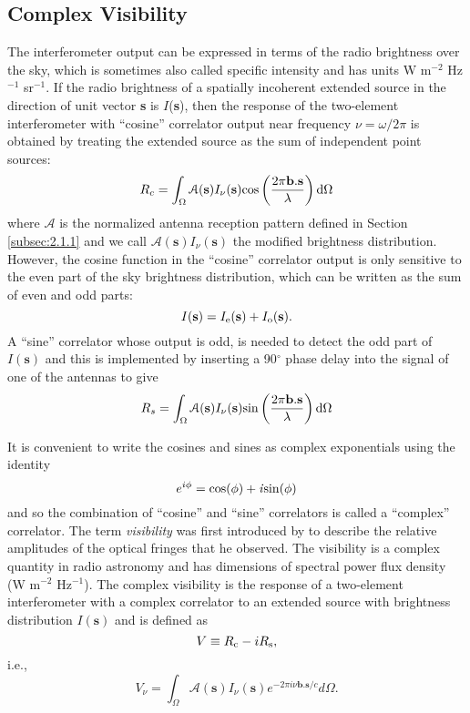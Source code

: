 \subsection{Complex Visibility}\label{subsec:6}
The interferometer output can be expressed in terms of the radio brightness over the sky, which is sometimes also called specific intensity and has units W m$^{-2}$ Hz$^{-1}$ sr$^{-1}$. If the radio brightness of a spatially incoherent extended source in the direction of unit vector \textbf{s} is $I$(\textbf{s}), then the response of the two-element interferometer with ``cosine'' correlator output near frequency $\nu =\omega/2\pi$ is obtained by treating the extended source as the sum of independent point sources:
\begin{equation}
R_{c}=\int _{\Omega}\mathcal{A}(\textbf{s})I_{\nu}(\textbf{s}) \rm{cos}\left(\frac{2\pi \textbf{b}.\textbf{s}}{\lambda} \right)d\Omega
\end{equation}
where $\mathcal{A}$ is the normalized antenna reception pattern defined in Section \ref{subsec:2.1.1} and we call $\mathcal{A}(\textbf{s})I_{\nu}(\textbf{s})$ the modified brightness distribution. However, the cosine function in the  ``cosine'' correlator output is only sensitive to the even part of the sky brightness distribution, which can be written as the sum of even and odd parts:
\begin{equation}
I(\textbf{s})=I_{\rm{e}}(\textbf{s})+I_{\rm{o}}(\textbf{s}).
\end{equation}
A ``sine'' correlator whose output is odd, is needed to detect the odd part of $I(\textbf{s})$ and this is implemented by inserting a 90$^{\circ}$ phase delay into the signal of one of the antennas to give
\begin{equation}
R_{s}=\int _{\Omega}\mathcal{A}(\textbf{s})I_{\nu}(\textbf{s}) \rm{sin}\left(\frac{2\pi \textbf{b}.\textbf{s}}{\lambda} \right)d\Omega
\end{equation}

It is convenient to write the cosines and sines as complex exponentials using the identity 
\begin{equation}
e^{i\phi} = \rm{cos}(\phi) + \mathit{i}\rm{sin}(\phi)
\end{equation}
and so the combination of ``cosine'' and ``sine'' correlators is called a ``complex'' correlator. The term \textit{visibility} was first introduced by \cite{michelson_1890} to describe the relative amplitudes of the optical fringes that he observed. The visibility is a complex quantity in radio astronomy and has dimensions of spectral power flux density (W m$^{-2}$ Hz$^{-1}$). The complex visibility is the response of a two-element interferometer with a complex correlator to an extended source with brightness distribution $I(\textbf{s})$  and is defined as
\begin{equation}
V\equiv R_{\rm{c}}-iR_{\rm{s}},
\end{equation}
i.e.,
\begin{equation}
V _{\nu} = \int _{\Omega}\mathcal{A}(\textbf{s})I_{\nu}(\textbf{s})\mathit{e}^{-2\pi \mathit{i} \nu \textbf{b}.\textbf{s}/c}d\Omega .
\label{eq:visib}
\end{equation}
